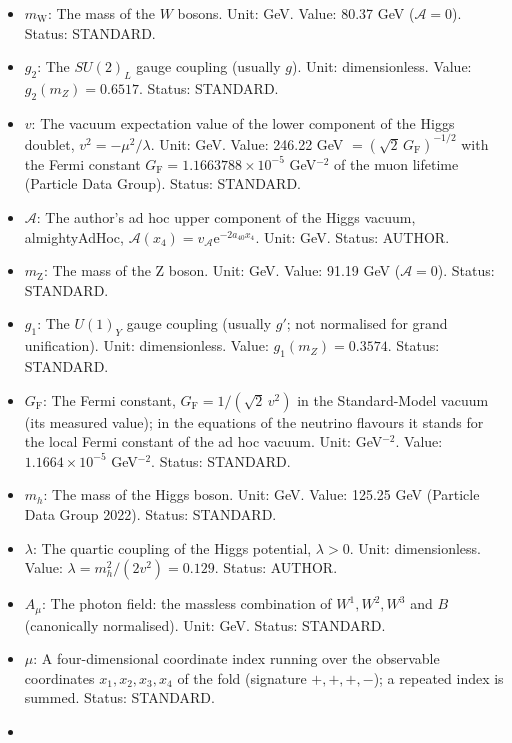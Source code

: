 \documentclass[
  10pt,
]{article}
\providecommand{\tightlist}{%
  \setlength{\itemsep}{0pt}\setlength{\parskip}{0pt}}
\begin{document}
\begin{itemize}
\tightlist
\item
  \(m_{\mathrm{W}}\): The mass of the \(W\) bosons. Unit: GeV. Value:
  80.37 GeV (\(\mathcal{A} = 0\)). Status: STANDARD.
\item
  \(g_2\): The \(SU(2)_L\) gauge coupling (usually \(g\)). Unit:
  dimensionless. Value: \(g_2(m_Z) = 0.6517\). Status: STANDARD.
\item
  \(v\): The vacuum expectation value of the lower component of the
  Higgs doublet, \(v^2 = -\mu^2/\lambda\). Unit: GeV. Value: 246.22 GeV
  \(= (\sqrt2\,G_{\mathrm{F}})^{-1/2}\) with the Fermi constant
  \(G_{\mathrm{F}} = 1.1663788\times10^{-5}\) GeV\(^{-2}\) of the muon
  lifetime (Particle Data Group). Status: STANDARD.
\item
  \(\mathcal{A}\): The author's ad hoc upper component of the Higgs
  vacuum, almightyAdHoc,
  \(\mathcal{A}(x_4) = v_{\mathcal{A}}\mathrm{e}^{-2a_{40}x_4}\). Unit:
  GeV. Status: AUTHOR.
\item
  \(m_{\mathrm{Z}}\): The mass of the Z boson. Unit: GeV. Value: 91.19
  GeV (\(\mathcal{A} = 0\)). Status: STANDARD.
\item
  \(g_1\): The \(U(1)_Y\) gauge coupling (usually \(g'\); not normalised
  for grand unification). Unit: dimensionless. Value:
  \(g_1(m_Z) = 0.3574\). Status: STANDARD.
\item
  \(G_{\mathrm{F}}\): The Fermi constant,
  \(G_{\mathrm{F}} = 1/(\sqrt2\,v^2)\) in the Standard-Model vacuum (its
  measured value); in the equations of the neutrino flavours it stands
  for the local Fermi constant of the ad hoc vacuum. Unit: GeV\(^{-2}\).
  Value: \(1.1664\times10^{-5}\) GeV\(^{-2}\). Status: STANDARD.
\item
  \(m_h\): The mass of the Higgs boson. Unit: GeV. Value: 125.25 GeV
  (Particle Data Group 2022). Status: STANDARD.
\item
  \(\lambda\): The quartic coupling of the Higgs potential,
  \(\lambda > 0\). Unit: dimensionless. Value:
  \(\lambda = m_h^2/(2v^2) = 0.129\). Status: AUTHOR.
\item
  \(A_\mu\): The photon field: the massless combination of
  \(W^1, W^2, W^3\) and \(B\) (canonically normalised). Unit: GeV.
  Status: STANDARD.
\item
  \(\mu\): A four-dimensional coordinate index running over the
  observable coordinates \(x_1, x_2, x_3, x_4\) of the fold (signature
  \(+,+,+,-\)); a repeated index is summed. Status: STANDARD.
\item

\end{itemize}
\end{document}
